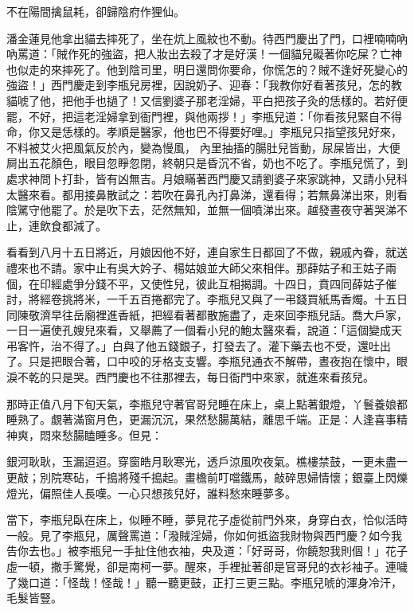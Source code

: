 \begin{showcontents}{}
不在陽間擒鼠耗，卻歸陰府作狸仙。

潘金蓮見他拿出貓去摔死了，坐在炕上風紋也不動。待西門慶出了門，口裡喃喃吶吶罵道：「賊作死的強盜，把人妝出去殺了才是好漢！一個貓兒礙著你吃屎？亡神也似走的來摔死了。他到陰司里，明日還問你要命，你慌怎的？賊不逢好死變心的強盜！」西門慶走到李瓶兒房裡，因說奶子、迎春：「我教你好看著孩兒，怎的教貓唬了他，把他手也撾了！又信劉婆子那老淫婦，平白把孩子灸的恁樣的。若好便罷，不好，把這老淫婦拿到衙門裡，與他兩拶！」李瓶兒道：「你看孩兒緊自不得命，你又是恁樣的。孝順是醫家，他也巴不得要好哩。」李瓶兒只指望孩兒好來，不料被艾火把風氣反於內，變為慢風，
內里抽搐的腸肚兒皆動，尿屎皆出，大便屙出五花顏色，眼目忽睜忽閉，終朝只是昏沉不省，奶也不吃了。李瓶兒慌了，到處求神問卜打卦，皆有凶無吉。月娘瞞著西門慶又請劉婆子來家跳神，又請小兒科太醫來看。都用接鼻散試之：若吹在鼻孔內打鼻涕，還看得；若無鼻涕出來，則看陰騭守他罷了。於是吹下去，茫然無知，並無一個噴涕出來。越發晝夜守著哭涕不止，連飲食都減了。

看看到八月十五日將近，月娘因他不好，連自家生日都回了不做，親戚內眷，就送禮來也不請。家中止有吳大妗子、楊姑娘並大師父來相伴。那薛姑子和王姑子兩個，在印經處爭分錢不平，又使性兒，彼此互相揭調。十四日，賁四同薛姑子催討，將經卷挑將米，一千五百捲都完了。李瓶兒又與了一弔錢買紙馬香燭。十五日同陳敬濟早往岳廟裡進香紙，把經看著都散施盡了，走來回李瓶兒話。喬大戶家，一日一遍使孔嫂兒來看，又舉薦了一個看小兒的鮑太醫來看，說道：「這個變成天弔客忤，治不得了。」白與了他五錢銀子，打發去了。灌下藥去也不受，還吐出了。只是把眼合著，口中咬的牙格支支響。李瓶兒通衣不解帶，晝夜抱在懷中，眼淚不乾的只是哭。西門慶也不往那裡去，每日衙門中來家，就進來看孩兒。

那時正值八月下旬天氣，李瓶兒守著官哥兒睡在床上，桌上點著銀燈，丫鬟養娘都睡熟了。覷著滿窗月色，更漏沉沉，果然愁腸萬結，離思千端。正是：人逢喜事精神爽，悶來愁腸瞌睡多。但見：

銀河耿耿，玉漏迢迢。穿窗皓月耿寒光，透戶涼風吹夜氣。樵樓禁鼓，一更未盡一更敲；別院寒砧，千搗將殘千搗起。畫檐前叮噹鐵馬，敲碎思婦情懷；銀臺上閃爍燈光，偏照佳人長嘆。一心只想孩兒好，誰料愁來睡夢多。

當下，李瓶兒臥在床上，似睡不睡，夢見花子虛從前門外來，身穿白衣，恰似活時一般。見了李瓶兒，厲聲罵道：「潑賊淫婦，你如何抵盜我財物與西門慶？如今我告你去也。」被李瓶兒一手扯住他衣袖，央及道：「好哥哥，你饒恕我則個！」花子虛一頓，撒手驚覺，卻是南柯一夢。醒來，手裡扯著卻是官哥兒的衣衫袖子。連噦了幾口道：「怪哉！怪哉！」聽一聽更鼓，正打三更三點。李瓶兒唬的渾身冷汗，毛髮皆豎。


\end{showcontents}

